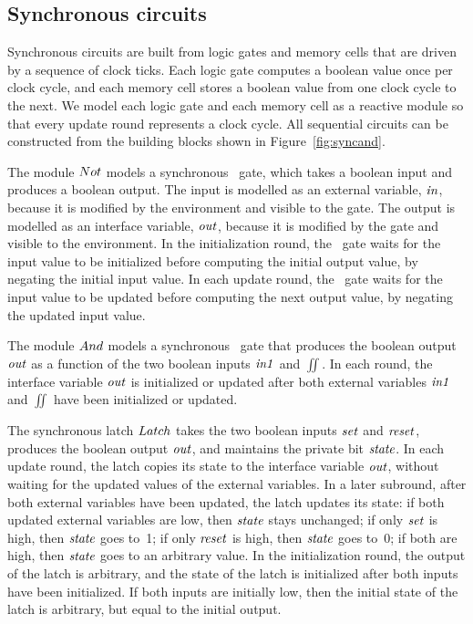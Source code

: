 \subsection{Synchronous circuits}

Synchronous circuits are built from logic gates and memory cells that are
driven by a sequence of clock ticks.
Each logic gate computes a boolean value once per clock cycle, and each
memory cell stores a boolean value from one clock cycle to the next.
We model each logic gate and each memory cell as a reactive module so that
every update round represents a clock cycle.
All sequential circuits can be constructed from the building blocks shown in
Figure~\ref{fig:syncand}.

\mypar The module $Not$ models a synchronous \Not\ gate, which
takes a boolean input and produces a boolean output. The input is
modelled as an external variable, ${\it in\/}$, because it is modified
by the environment and visible to the gate. The output is modelled
as an interface variable, ${\it out\/}$, because it is modified by the
gate and visible to the environment. In the initialization round,
the \Not\ gate waits for the input value to be initialized before
computing the initial output value, by negating the initial input
value. In each update round, the \Not\ gate waits for the input
value to be updated before computing the next output value, by
negating the updated input value.

\mypar
The module $And$ models a synchronous \And\ gate that produces the boolean
output ${\it out\/}$ as a function of the two boolean inputs ${\it in1\/}$ and $\iint$.
In each round, the interface variable ${\it out\/}$ is initialized or updated after
both external variables ${\it in1\/}$ and $\iint$ have been initialized or
updated.

\mypar
The synchronous latch $Latch$ takes the two boolean inputs ${\it set\/}$ and
${\it reset\/}$, produces the boolean output ${\it out\/}$, and maintains the private bit
${\it state\/}$.
In each update round, the latch copies its state to the interface variable
${\it out\/}$, without waiting for the updated values of the external variables.
In a later subround, after both external variables have been updated, the
latch updates its state:
if both updated external variables are low, then ${\it state\/}$ stays unchanged;
if only ${\it set\/}$ is high, then ${\it state\/}$ goes to~1;
if only ${\it reset\/}$ is high, then ${\it state\/}$ goes to~0;
if both are high, then ${\it state\/}$ goes to an arbitrary value.
In the initialization round, the output of the latch is arbitrary, and the
state of the latch is initialized after both inputs have been initialized.
If both inputs are initially low, then the initial state of the latch is
arbitrary, but equal to the initial output.

